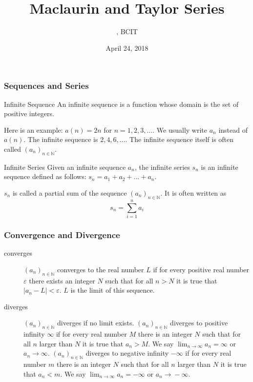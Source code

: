 \documentclass[xcolor=dvipsnames]{beamer}
\title{Maclaurin and Taylor Series}
\subtitle{{\CourseNumber}, BCIT}
\author{\CourseName}
\date{April 24, 2018}
\begin{document}
\begin{frame}
  \titlepage
\end{frame}

\begin{frame}
  \frametitle{Sequences and Series}
  \begin{block}{Infinite Sequence}
    An infinite sequence is a function whose
    domain is the set of positive integers.
  \end{block}
Here is an example: $a(n)=2n$ for $n=1,2,3,\ldots$. We usually write
$a_{n}$ instead of $a(n)$. The infinite sequence is $2,4,6,\ldots$.
The infinite sequence itself is often called $(a_{n})_{n\in\mathbb{N}}$.
\begin{block}{Infinite Series}
  Given an infinite sequence $a_{n}$, the infinite series $s_{n}$ is
  an infinite sequence defined as follows: $s_{n}=a_{1}+a_{2}+\ldots{}+a_{n}$.
\end{block}
$s_{n}$ is called a partial sum of the sequence
$(a_{n})_{n\in\mathbb{N}}$. It is often written as
\begin{equation}
  \label{eq:tahxooke}
  s_{n}=\sum_{i=1}^{n}a_{i}
\end{equation}
\end{frame}

\begin{frame}
  \frametitle{Convergence and Divergence}
  \begin{description}
  \item[converges] $(a_{n})_{n\in\mathbb{N}}$ converges to the real
    number $L$ if for every positive real number $\varepsilon$ there
    exists an integer $N$ such that for all $n>N$ it is true that
    $\vert{}a_{n}-L\vert{}<\varepsilon$. $L$ is the \alert{limit} of
    this sequence.
  \item[diverges] $(a_{n})_{n\in\mathbb{N}}$ diverges if no limit
    exists. $(a_{n})_{n\in\mathbb{N}}$ diverges to positive infinity
    $\infty$ if for every real number $M$ there is an integer $N$ such
    that for all $n$ larger than $N$ it is true that $a_{n}>M$. We say
    $\lim_{n\rightarrow\infty}a_{n}=\infty$ or
    $a_{n}\longrightarrow\infty$. $(a_{n})_{n\in\mathbb{N}}$ diverges
    to negative infinity $-\infty$ if for every real number $m$ there
    is an integer $N$ such that for all $n$ larger than $N$ it is true
    that $a_{n}<m$. We say $\lim_{n\rightarrow\infty}a_{n}=-\infty$ or
    $a_{n}\longrightarrow{}-\infty$.
  \end{description}
\end{frame}
\end{document}
